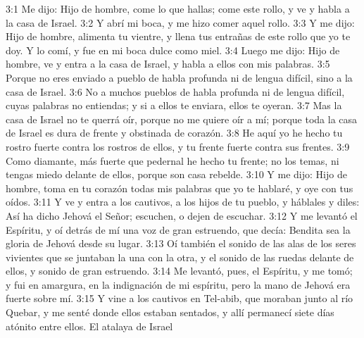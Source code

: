 3:1 Me dijo: Hijo de hombre, come lo que hallas; come este rollo, y ve y habla a la casa de Israel.   
3:2 Y abrí mi boca, y me hizo comer aquel rollo.   
3:3 Y me dijo: Hijo de hombre, alimenta tu vientre, y llena tus entrañas de este rollo que yo te doy. Y lo comí, y fue en mi boca dulce como miel. 
3:4 Luego me dijo: Hijo de hombre, ve y entra a la casa de Israel, y habla a ellos con mis palabras. 
3:5 Porque no eres enviado a pueblo de habla profunda ni de lengua difícil, sino a la casa de Israel.   
3:6 No a muchos pueblos de habla profunda ni de lengua difícil, cuyas palabras no entiendas; y si a ellos te enviara, ellos te oyeran.   
3:7 Mas la casa de Israel no te querrá oír, porque no me quiere oír a mí; porque toda la casa de Israel es dura de frente y obstinada de corazón.   
3:8 He aquí yo he hecho tu rostro fuerte contra los rostros de ellos, y tu frente fuerte contra sus frentes.   
3:9 Como diamante, más fuerte que pedernal he hecho tu frente; no los temas, ni tengas miedo delante de ellos, porque son casa rebelde.   
3:10 Y me dijo: Hijo de hombre, toma en tu corazón todas mis palabras que yo te hablaré, y oye con tus oídos.   
3:11 Y ve y entra a los cautivos, a los hijos de tu pueblo, y háblales y diles: Así ha dicho Jehová el Señor; escuchen, o dejen de escuchar.   
3:12 Y me levantó el Espíritu, y oí detrás de mí una voz de gran estruendo, que decía: Bendita sea la gloria de Jehová desde su lugar.   
3:13 Oí también el sonido de las alas de los seres vivientes que se juntaban la una con la otra, y el sonido de las ruedas delante de ellos, y sonido de gran estruendo.   
3:14 Me levantó, pues, el Espíritu, y me tomó; y fui en amargura, en la indignación de mi espíritu, pero la mano de Jehová era fuerte sobre mí.   
3:15 Y vine a los cautivos en Tel-abib, que moraban junto al río Quebar, y me senté donde ellos estaban sentados, y allí permanecí siete días atónito entre ellos.   
El atalaya de Israel   

